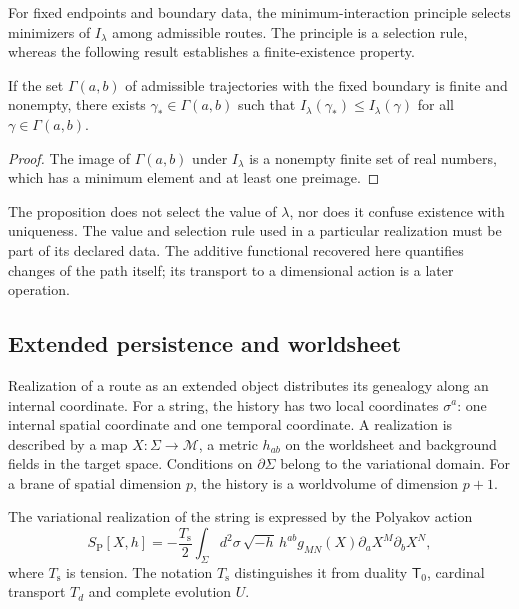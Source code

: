 For fixed endpoints and boundary data, the
minimum-interaction principle selects minimizers of
\(I_\lambda\) among admissible routes. The principle
is a selection rule, whereas the following
result establishes a finite-existence property.

\begin{proposition}
If the set \(\Gamma(a,b)\) of admissible trajectories
with the fixed boundary is finite and nonempty, there exists
\(\gamma_*\in\Gamma(a,b)\) such that
\(I_\lambda(\gamma_*)\leq I_\lambda(\gamma)\)
for all \(\gamma\in\Gamma(a,b)\).
\end{proposition}
\begin{proof}
The image of \(\Gamma(a,b)\) under \(I_\lambda\) is
a nonempty finite set of real numbers, which has
a minimum element and at least one preimage.
\end{proof}

The proposition does not select the value of \(\lambda\),
nor does it confuse existence with uniqueness. The value and
selection rule used in a particular realization
must be part of its declared data. The additive
functional recovered here quantifies changes of the path
itself; its transport to a dimensional action is
a later operation.

\subsection{Extended persistence and worldsheet}

Realization of a route as an extended object distributes
its genealogy along an internal coordinate. For a string,
the history has two local coordinates \(\sigma^a\):
one internal spatial coordinate and one temporal coordinate. A realization is
described by a map \(X:\Sigma\to\mathcal M\), a
metric \(h_{ab}\) on the worldsheet and background
fields in the target space. Conditions on
\(\partial\Sigma\) belong to the variational domain.
For a brane of spatial dimension \(p\), the history
is a worldvolume of dimension \(p+1\).

The variational realization of the string is expressed by
the Polyakov action
\begin{equation}
 S_{\mathrm P}[X,h]
 =-\frac{T_{\mathrm s}}2\int_\Sigma d^2\sigma\,
 \sqrt{-h}\,h^{ab}g_{MN}(X)
             \partial_aX^M\partial_bX^N,
 \label{iv:eq:polyakov}
\end{equation}
where \(T_{\mathrm s}\) is tension. The notation
\(T_{\mathrm s}\) distinguishes it from duality
\(\mathsf T_0\), cardinal transport \(T_d\)
and complete evolution \(U\).

